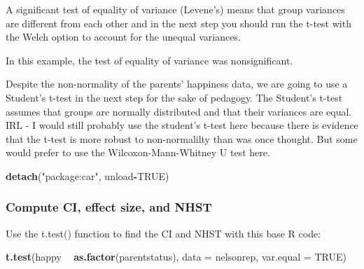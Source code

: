 \documentclass[
]{book}
\newenvironment{Shaded}{\begin{snugshade}}{\end{snugshade}}
\newcommand{\DataTypeTok}[1]{\textcolor[rgb]{0.13,0.29,0.53}{#1}}
\newcommand{\KeywordTok}[1]{\textcolor[rgb]{0.13,0.29,0.53}{\textbf{#1}}}
\newcommand{\NormalTok}[1]{#1}
\newcommand{\OperatorTok}[1]{\textcolor[rgb]{0.81,0.36,0.00}{\textbf{#1}}}
\newcommand{\OtherTok}[1]{\textcolor[rgb]{0.56,0.35,0.01}{#1}}
\newcommand{\StringTok}[1]{\textcolor[rgb]{0.31,0.60,0.02}{#1}}
\begin{document}
A significant test of equality of variance (Levene's) means that group variances are different from each other and in the next step you should run the t-test with the Welch option to account for the unequal variances.

In this example, the test of equality of variance was nonsignificant.

Despite the non-normality of the parents' happiness data, we are going to use a Student's t-test in the next step for the sake of pedagogy. The Student's t-test assumes that groups are normally distributed and that their variances are equal. IRL - I would still probably use the student's t-test here because there is evidence that the t-test is more robust to non-normalilty than was once thought. But some would prefer to use the Wilcoxon-Mann-Whitney U test here.

\begin{Shaded}
\begin{Highlighting}[]
\KeywordTok{detach}\NormalTok{(}\StringTok{"package:car"}\NormalTok{, unload}\OperatorTok{-}\OtherTok{TRUE}\NormalTok{)}
\end{Highlighting}
\end{Shaded}

\hypertarget{compute-ci-effect-size-and-nhst-1}{%
\subsubsection{Compute CI, effect size, and NHST}\label{compute-ci-effect-size-and-nhst-1}}

Use the t.test() function to find the CI and NHST with this base R code:

\begin{Shaded}
\begin{Highlighting}[]
\KeywordTok{t.test}\NormalTok{(happy }\OperatorTok{~}\StringTok{ }\KeywordTok{as.factor}\NormalTok{(parentstatus), }\DataTypeTok{data =}\NormalTok{ nelsonrep, }\DataTypeTok{var.equal =} \OtherTok{TRUE}\NormalTok{)}
\end{Highlighting}
\end{Shaded}
\end{document}
